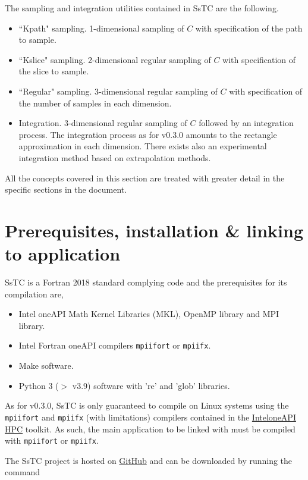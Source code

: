 \documentclass[10pt,a4paper]{article}
\begin{document}
The sampling and integration utilities contained in SsTC are the following.
\begin{tcolorbox}\begin{itemize}
\item ``Kpath" sampling. 1-dimensional sampling of $C$ with specification of the path to sample.
\item ``Kslice" sampling. 2-dimensional regular sampling of $C$ with specification of the slice to sample.
\item ``Regular" sampling. 3-dimensional regular sampling of $C$ with specification of the number of samples in each dimension.
\item Integration. 3-dimensional regular sampling of $C$ followed by an integration process. The integration process as for v0.3.0 amounts to the rectangle approximation in each dimension. There exists also an experimental integration method based on extrapolation methods.
\end{itemize}\end{tcolorbox}
All the concepts covered in this section are treated with greater detail in the specific sections in the document.
\section{Prerequisites, installation \& linking to application}\label{sec:install}
SsTC is a Fortran 2018 standard complying code and the prerequisites for its compilation are,
\begin{tcolorbox}\begin{itemize}
\item Intel oneAPI Math Kernel Libraries (MKL), OpenMP library and MPI library.
\item Intel Fortran oneAPI compilers \verb|mpiifort| or \verb|mpiifx|.
\item Make software.
\item Python 3 ($>$ v3.9) software with 're' and 'glob' libraries.
\end{itemize}\end{tcolorbox}
As for v0.3.0, SsTC is only guaranteed to compile on Linux systems using the \verb|mpiifort| and \verb|mpiifx| (with limitations) compilers contained in the \href{https://www.intel.com/content/www/us/en/developer/tools/oneapi/hpc-toolkit.html}{Intel\textregistered oneAPI HPC} toolkit. As such, the main application to be linked with must be compiled with \verb|mpiifort| or \verb|mpiifx|.

The SsTC project is hosted on \href{https://github.com/irukoa/SsTC}{GitHub} and can be downloaded by running the command
\end{document}
